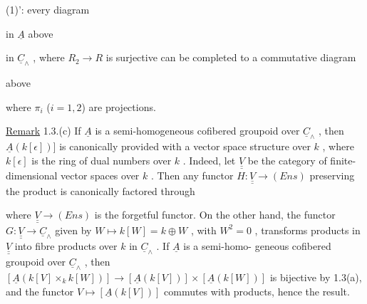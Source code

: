 (1)':  every diagram

  in  $\underline{A}$  above    in  $\underline{C}_{\wedge}$ , where
$R_{2} \to R$  is surjective can be completed to a commutative diagram

\begin{center}
  above  
\end{center}
where  $\pi_{i}$  ($i = 1,2$)  are projections.

\underline{Remark} 1.3.(c)  If  $\underline{A}$  is a semi-homogeneous cofibered groupoid over  $\underline{C}_{\wedge}$ , then
 $\underline{A}(k [\epsilon])]$ is canonically provided with a vector space structure over  $k$ , where
$k [\epsilon]$ is the ring of dual numbers over  $k$ . Indeed, let  $\underline{\underline{V}}$  be the category of
finite-dimensional vector spaces over  $k$ . Then any functor  $H : \underline{\underline{V}} \to (Ens)$
preserving the product is canonically factored through

\begin{center}
\end{center}
where  $\underline{\underline{V}} \to (Ens)$  is the forgetful functor. On the other hand, the functor
$G : \underline{\underline{V}} \longrightarrow \underline{C}_{\wedge}$  given by  $W \longmapsto k[W] = k \oplus W$ , with  $W^{2} = 0$ , transforms
products in  $\underline{\underline{V}}$  into fibre products over  $k$  in  $\underline{C}_{\wedge}$ . If  $\underline{A}$  is a semi-homo-
geneous cofibered groupoid over  $\underline{C}_{\wedge}$ , then  $[\underline{A}(k[V] \times_{k} k[W])] \longrightarrow [\underline{A}(k[V])] \times [\underline{A}(k[W])]$
is bijective by 1.3(a), and the functor  $V \longmapsto [\underline{A}(k[V])]$  commutes with products,
hence the result.

